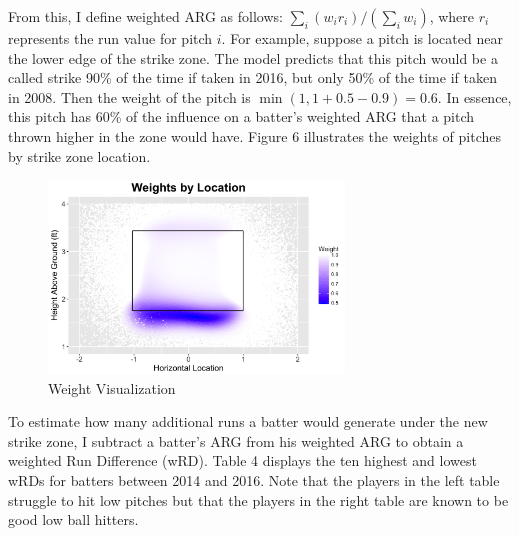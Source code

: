 \documentclass[11pt]{article}
\begin{document}
From this, I define weighted ARG as follows: $\sum_i (w_i r_i)/ (\sum_i w_i)$, where $r_i$ represents the run value for pitch $i$.  For example, suppose a pitch is located near the lower edge of the strike zone.  The model predicts that this pitch would be a called strike 90\% of the time if taken in 2016, but only 50\% of the time if taken in 2008.  Then the weight of the pitch is $\min(1, 1 + 0.5 - 0.9) = 0.6$.    In essence, this pitch has 60\% of the influence on a batter's weighted ARG that a pitch thrown higher in the zone would have.  Figure 6 illustrates the weights of pitches by strike zone location.  

\begin{figure}[ht]
\centering
\includegraphics[width = 0.7\textwidth]{../Output/fig6.png}
\caption{Weight Visualization}
\end{figure}

To estimate how many additional runs a batter would generate under the new strike zone, I subtract a batter's ARG from his weighted ARG to obtain a weighted Run Difference (wRD).  Table 4 displays the ten highest and lowest wRDs for batters between 2014 and 2016.  Note that the players in the left table struggle to hit low pitches but that the players in the right table are known to be good low ball hitters.
\end{document}
